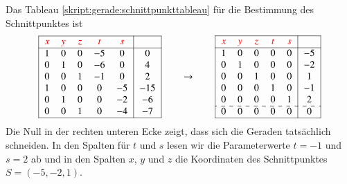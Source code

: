 \begin{beispiel}
{\parindent 0pt Das}
Tableau \eqref{skript:gerade:schnittpunkttableau} für die Bestimmung
des Schnittpunktes ist
\begin{equation*}
\begin{tabular}{|>{$}c<{$}>{$}c<{$}>{$}c<{$}>{$}c<{$}>{$}c<{$}|>{$}c<{$}|}
\hline
\color{red}x&\color{red}y&\color{red}z&\color{red}t&\color{red}s&\\
\hline
1&0&0&-5& 0&0\\
0&1&0&-6& 0&4\\
0&0&1&-1& 0&2\\
1&0&0& 0&-5&-15\\
0&1&0& 0&-2&-6\\
0&0&1& 0&-4&-7\\
\hline
\end{tabular}
\qquad\rightarrow\qquad
\begin{tabular}{|>{$}c<{$}>{$}c<{$}>{$}c<{$}>{$}c<{$}>{$}c<{$}|>{$}c<{$}|}
\hline
\color{red}x&\color{red}y&\color{red}z&\color{red}t&\color{red}s&\\
\hline
1&0&0&0&0&-5\\
0&1&0&0&0&-2\\
0&0&1&0&0&1\\
0&0&0&1&0&-1\\
0&0&0&0&1&2\\
\hdashline
0&0&0&0&0&0\\
\hline
\end{tabular}
\end{equation*}
Die Null in der rechten unteren Ecke zeigt, dass sich die Geraden
tatsächlich schneiden.
In den Spalten für $t$ und $s$ lesen wir die Parameterwerte
$t=-1$ und $s=2$ ab
und in den Spalten $x$, $y$ und $z$ die Koordinaten des
Schnittpunktes
$S=(-5,-2,1)$.
\end{beispiel}

